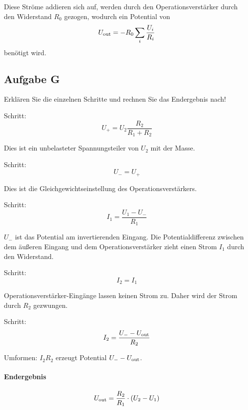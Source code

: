Diese Ströme addieren sich auf, werden durch den Operationsverstärker durch den
Widerstand $R_0$ gezogen, wodurch ein Potential von
\[
	U_\text{out} = - R_0 \sum_i \frac{U_i}{R_i}
\]
benötigt wird.

\subsection{Aufgabe G}

\begin{problem}
	Erklären Sie die einzelnen Schritte und rechnen Sie das Endergebnis nach!
\end{problem}

Schritt:
\begin{equation}
	\label{eq:G1}
	U_+ = U_2 \frac{R_2}{R_1 + R_2}
\end{equation}

Dies ist ein unbelasteter Spannungsteiler von $U_2$ mit der Masse.

Schritt:
\begin{equation}
	\label{eq:G2}
	U_- = U_+
\end{equation}

Dies ist die Gleichgewichtseinstellung des Operationsverstärkers.

Schritt:
\begin{equation}
	\label{eq:G3}
	I_1 = \frac{U_1 - U_-}{R_1}
\end{equation}

$U_-$ ist das Potential am invertierenden Eingang. Die Potentialdifferenz
zwischen dem äußeren Eingang und dem Operationsverstärker zieht einen Strom
$I_1$ durch den Widerstand.

Schritt:
\begin{equation}
	\label{eq:G4}
	I_2 = I_1
\end{equation}

Operationsverstärker-Eingänge lassen keinen Strom zu. Daher wird der Strom
durch $R_2$ gezwungen.

Schritt:
\begin{equation}
	\label{eq:G5}
	I_2 = \frac{U_- - U_\text{out}}{R_2}
\end{equation}

Umformen: $I_2 R_2$ erzeugt Potential $U_- - U_\text{out}$.

\paragraph{Endergebnis}
\[
	U_\text{out} = \frac{R_2}{R_1} \cdot (U_2 - U_1)
\]

